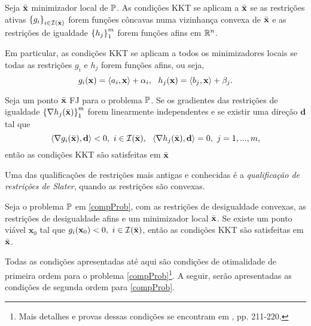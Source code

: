 \begin{corollary}\label{cor:restLinConc}
Seja $\bar{\mathbf{x}}$ minimizador local de $\mathbb{P}$. As condi\c{c}\~{o}es KKT se aplicam a $\bar{\mathbf{x}}$ se as restri\c{c}\~{o}es ativas $\left\lbrace g_i\right\rbrace_{i \in \mathcal{I}(\bar{\mathbf{x}})}$ forem fun\c{c}\~{o}es c\^{o}ncavas numa vizinhan\c{c}a convexa de $\bar{\mathbf{x}}$ e as restri\c{c}\~{o}es de igualdade $\left\lbrace h_j\right\rbrace_{1}^{m}$ forem fun\c{c}\~{o}es afins em $\mathbb{R}^{n}$.

Em particular, as condi\c{c}\~{o}es KKT se aplicam a todos os minimizadores locais se todas as restri\c{c}\~{o}es $g_i$ e $h_j$ forem fun\c{c}\~{o}es afins, ou seja,
\begin{equation*}
g_i(\mathbf{x}) = \left\langle a_i,\mathbf{x}\right\rangle + \alpha_i ,~~ h_j(\mathbf{x}) = \left\langle b_j,\mathbf{x}\right\rangle + \beta_j.
\end{equation*}
\end{corollary}

\begin{theorem}
Seja um ponto $\bar{\mathbf{x}}$ FJ para o problema $\mathbb{P}$. Se os gradientes das restri\c{c}\~{o}es de igualdade $\left\lbrace\nabla h_j(\bar{\mathbf{x}})\right\rbrace_{1}^{m}$ forem linearmente independentes e se existir uma dire\c{c}\~{a}o $\mathbf{d}$ tal que 
\begin{equation}
\left\langle\nabla g_i(\bar{\mathbf{x}}),\mathbf{d}\right\rangle < 0,~i \in \mathcal{I}(\bar{\mathbf{x}}),~~\left\langle\nabla h_j(\bar{\mathbf{x}}),\mathbf{d}\right\rangle = 0,~j = 1,...,m,
\end{equation}
ent\~{a}o as condi\c{c}\~{o}es KKT s\~{a}o satisfeitas em $\bar{\mathbf{x}}$
\end{theorem}

Uma das qualifica\c{c}\~{o}es de restri\c{c}\~{o}es mais antigas e conhecidas \'{e} a \textit{qualifica\c{c}\~{a}o de restri\c{c}\~{o}es de Slater}, quando as restri\c{c}\~{o}es s\~{a}o convexas.

\begin{corollary}[Slater]
Seja o problema $\mathbb{P}$ em \eqref{compProb}, com as restri\c{c}\~{o}es de desigualdade convexas, as restri\c{c}\~{o}es de desigualdade afins e um minimizador local $\bar{\mathbf{x}}$. Se existe um ponto vi\'{a}vel $\mathbf{x}_0$ tal que $g_i(\mathbf{x}_0) <0,~i \in \mathcal{I}(\bar{\mathbf{x}})$, ent\~{a}o as condi\c{c}\~{o}es KKT s\~{a}o satisfeitas em $\bar{\mathbf{x}}$.
\end{corollary}

Todas as condi\c{c}\~{o}es apresentadas at\'{e} aqui s\~{a}o condi\c{c}\~{o}es de otimalidade de primeira ordem para o problema \eqref{compProb}\footnote{Mais detalhes e provas dessas condi\c{c}\~{o}es se encontram em \cite{guller}, pp. 211-220.}. A seguir, ser\~{a}o apresentadas as condi\c{c}\~{o}es de segunda ordem para \eqref{compProb}. 

